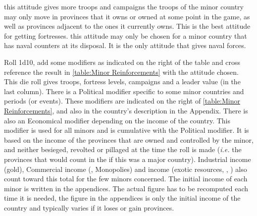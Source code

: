 \bparag[Offensive:] this attitude gives more troops and campaigns
%
\bparag[Defensive:] the troops of the minor country may only move in provinces
that it owns or owned at some point in the game, as well as provinces adjacent
to the ones it currently owns. This is the best attitude for getting
fortresses.
\bparag[Naval:] this attitude may only be chosen for a minor country that has
naval counters at its disposal. It is the only attitude that gives naval
forces.
%



\bparag Roll 1d10, add some modifiers as indicated on the right of the table
and cross reference the result in \ref{table:Minor Reinforcements} with the
attitude chosen.
\bparag This die roll gives troops, fortress levels, campaigns and a leader
value (in the last column).
\bparag[Political] There is a Political modifier specific to some minor
countries and periods (or events). These modifiers are indicated on the right
of \ref{table:Minor Reinforcements}, and also in the country's description in
the Appendix.
\bparag[Incomes] There is also an Economical modifier depending on the income
of the country. This modifier is used for all minors and is cumulative with
the Political modifier. It is based on the income of the provinces that are
owned and controlled by the minor, and neither besieged, revolted or pillaged
at the time the roll is made (\emph{i.e.} the provinces that would count in
the  if this was a major country). Industrial income
(gold), Commercial income (\TradeFLEET, Monopolies) and \ROTW income (exotic
resources, \COL, \TP) also count toward this total for the few minors
concerned.
\bparag The initial income of each minor is written in the appendices. The
actual figure has to be recomputed each time it is needed, the figure in the
appendices is only the initial income of the country and typically varies if
it loses or gain provinces.

